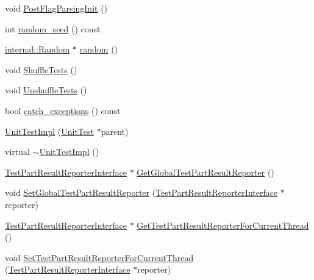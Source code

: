 \begin{DoxyCompactItemize}
\item 
void \hyperlink{classtesting_1_1internal_1_1UnitTestImpl_a3d68c6d1fdec822210f96171a3b57b47}{\-Post\-Flag\-Parsing\-Init} ()
\item 
int \hyperlink{classtesting_1_1internal_1_1UnitTestImpl_ac0bcee84bdc839bfabd0a829642ab4f7}{random\-\_\-seed} () const 
\item 
\hyperlink{classtesting_1_1internal_1_1Random}{internal\-::\-Random} $\ast$ \hyperlink{classtesting_1_1internal_1_1UnitTestImpl_a485dc510d5b4af5835231d23e5510b25}{random} ()
\item 
void \hyperlink{classtesting_1_1internal_1_1UnitTestImpl_a1835112b5b9bb3931956c68f05a3cf69}{\-Shuffle\-Tests} ()
\item 
void \hyperlink{classtesting_1_1internal_1_1UnitTestImpl_ae4c0afbfb6a7d13aece4c3a256a5d01d}{\-Unshuffle\-Tests} ()
\item 
bool \hyperlink{classtesting_1_1internal_1_1UnitTestImpl_ac7a9709851e6b257627f82921cbdeb7d}{catch\-\_\-exceptions} () const 
\item 
\hyperlink{classtesting_1_1internal_1_1UnitTestImpl_aee362cac8540779d6b2287bd44f15444}{\-Unit\-Test\-Impl} (\hyperlink{classtesting_1_1UnitTest}{\-Unit\-Test} $\ast$parent)
\item 
virtual \hyperlink{classtesting_1_1internal_1_1UnitTestImpl_a7ed37f715469544e5e426b89b79d07db}{$\sim$\-Unit\-Test\-Impl} ()
\item 
\hyperlink{classtesting_1_1TestPartResultReporterInterface}{\-Test\-Part\-Result\-Reporter\-Interface} $\ast$ \hyperlink{classtesting_1_1internal_1_1UnitTestImpl_a8d944ff1c21128f6537597a403287b71}{\-Get\-Global\-Test\-Part\-Result\-Reporter} ()
\item 
void \hyperlink{classtesting_1_1internal_1_1UnitTestImpl_a5d379c4ca61275c92e23f8605a67c918}{\-Set\-Global\-Test\-Part\-Result\-Reporter} (\hyperlink{classtesting_1_1TestPartResultReporterInterface}{\-Test\-Part\-Result\-Reporter\-Interface} $\ast$reporter)
\item 
\hyperlink{classtesting_1_1TestPartResultReporterInterface}{\-Test\-Part\-Result\-Reporter\-Interface} $\ast$ \hyperlink{classtesting_1_1internal_1_1UnitTestImpl_a4e160e9e1b736e0ce1fd49918af86da5}{\-Get\-Test\-Part\-Result\-Reporter\-For\-Current\-Thread} ()
\item 
void \hyperlink{classtesting_1_1internal_1_1UnitTestImpl_ab71b8e31b6a6f77a3c80e76f1a17336c}{\-Set\-Test\-Part\-Result\-Reporter\-For\-Current\-Thread} (\hyperlink{classtesting_1_1TestPartResultReporterInterface}{\-Test\-Part\-Result\-Reporter\-Interface} $\ast$reporter)

\end{DoxyCompactItemize}
